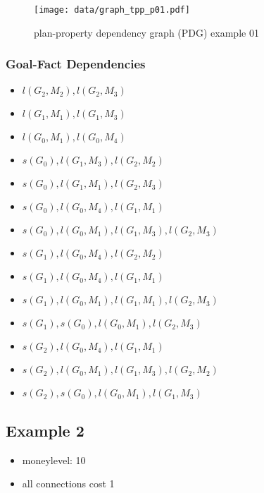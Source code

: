 \begin{figure}[ht]
\begin{center}
	\texttt{[image: data/graph\_tpp\_p01.pdf]}
\end{center}
\caption{plan-property dependency graph (PDG) example 01}
\end{figure}

\FloatBarrier
\subsubsection*{Goal-Fact Dependencies}
\begin{itemize}
	\item $l(G_2,M_2),l(G_2,M_3)$
	\item $l(G_1,M_1),l(G_1,M_3)$
	\item $l(G_0,M_1),l(G_0,M_4)$
	\item $s(G_0),l(G_1,M_3),l(G_2,M_2)$
	\item $s(G_0),l(G_1,M_1),l(G_2,M_3)$
	\item $s(G_0),l(G_0,M_4),l(G_1,M_1)$
	\item $s(G_0),l(G_0,M_1),l(G_1,M_3),l(G_2,M_3)$
	\item $s(G_1),l(G_0,M_4),l(G_2,M_2)$
	\item $s(G_1),l(G_0,M_4),l(G_1,M_1)$
	\item $s(G_1),l(G_0,M_1),l(G_1,M_1),l(G_2,M_3)$
	\item $s(G_1),s(G_0),l(G_0,M_1),l(G_2,M_3)$
	\item $s(G_2),l(G_0,M_4),l(G_1,M_1)$
	\item $s(G_2),l(G_0,M_1),l(G_1,M_3),l(G_2,M_2)$
	\item $s(G_2),s(G_0),l(G_0,M_1),l(G_1,M_3)$
\end{itemize}

\subsection*{Example 2}

\begin{itemize}
	\item moneylevel: 10
	\item all connections cost 1
\end{itemize}

\begin{center}
\end{center}

